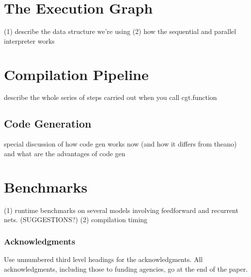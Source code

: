 \documentclass{article} %
\begin{document}
\section{The Execution Graph}

(1) describe the data structure we're using
(2) how the sequential and parallel interpreter works

\section{Compilation Pipeline}

describe the whole series of steps carried out when you call cgt.function

\subsection{Code Generation}
special discussion of how code gen works now (and how it differs from theano) and what are the advantages of code gen



\section{Benchmarks}

(1) runtime benchmarks on several models involving feedforward and recurrent nets. (SUGGESTIONS?)
(2) compilation timing

\subsubsection*{Acknowledgments}

Use unnumbered third level headings for the acknowledgments. All
acknowledgments, including those to funding agencies, go at the end of the paper.


\nocite{*}

\end{document}
